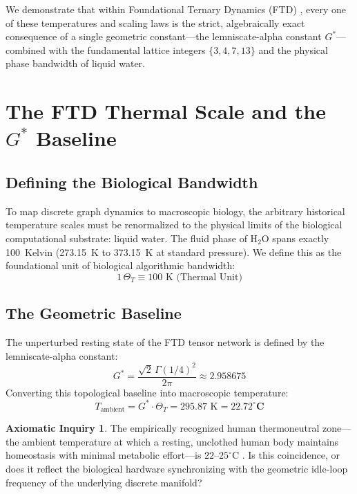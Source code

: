 \documentclass[11pt, letterpaper]{article}
\newcommand{\G}{G^*}
\theoremstyle{definition}
\newtheorem{inquiry}{Axiomatic Inquiry}[section]
\theoremstyle{remark}
\begin{document}
We demonstrate that within Foundational Ternary Dynamics (FTD) \cite{cpaci-tani2026_Zenodo}, every one of these temperatures and scaling laws is the strict, algebraically exact consequence of a single geometric constant---the lemniscate-alpha constant $\G$---combined with the fundamental lattice integers $\{3, 4, 7, 13\}$ and the physical phase bandwidth of liquid water.

\section{The FTD Thermal Scale and the $\G$ Baseline}

\subsection{Defining the Biological Bandwidth}

To map discrete graph dynamics to macroscopic biology, the arbitrary historical temperature scales must be renormalized to the physical limits of the biological computational substrate: liquid water. The fluid phase of H$_2$O spans exactly 100~Kelvin (273.15~K to 373.15~K at standard pressure). We define this as the foundational unit of biological algorithmic bandwidth:
\begin{equation}
    1\,\Theta_T \equiv 100 \text{ K (Thermal Unit)}
\end{equation}

\subsection{The Geometric Baseline}

The unperturbed resting state of the FTD tensor network is defined by the lemniscate-alpha constant:
\begin{equation}
    \G = \frac{\sqrt{2}\,\Gamma(1/4)^2}{2\pi} \approx 2.958675
\end{equation}
Converting this topological baseline into macroscopic temperature:
\begin{equation}
    T_{\text{ambient}} = \G \cdot \Theta_T = 295.87 \text{ K} = \mathbf{22.72^\circ\text{C}}
\end{equation}

\begin{inquiry}
The empirically recognized human thermoneutral zone---the ambient temperature at which a resting, unclothed human body maintains homeostasis with minimal metabolic effort---is $22$--$25^\circ$C \cite{ASHRAE2017}. Is this coincidence, or does it reflect the biological hardware synchronizing with the geometric idle-loop frequency of the underlying discrete manifold?
\end{inquiry}
\end{document}
